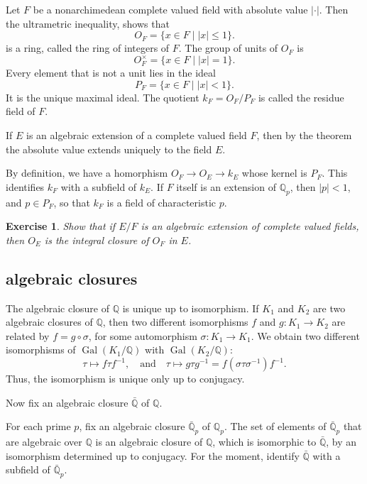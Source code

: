 \documentclass{amsart}
\def\op#1{{\operatorname{#1}}}
\newcommand{\ring}[1]{\mathbb{#1}}
\newtheorem{exercise}{Exercise}
\def\abs#1{{|#1|}}
\begin{document}
Let $F$ be a nonarchimedean complete valued field with absolute value $\abs{\cdot}$.
Then the ultrametric inequality, shows that
\[
O_F = \{x\in F \mid \abs{x}\le 1\}.
\]
is a ring, called the ring of integers of $F$.  
The group of units of $O_F$ is
\[
O^\times_F = \{x \in F \mid \abs{x}=1\}.
\]
Every element that is not a unit lies in the ideal
\[
P_F = \{x \in F \mid \abs{x}<1\}.
\]
It is the unique maximal ideal.  The quotient
$k_F = O_F/P_F$ is called the residue field of $F$.

If $E$ is an algebraic extension of a complete valued field $F$, 
then by the theorem the absolute
value extends uniquely to the field $E$.

By definition, we have a homorphism
$O_F \to O_E \to k_E$
whose kernel is $P_F$.  This identifies $k_F$ with a subfield of $k_E$.
If  $F$ itself is an extension of $\ring{Q}_p$, then $\abs{p}<1$, and $p\in P_F$,
so that $k_F$ is a field of  characteristic $p$.

\begin{exercise} Show that if $E/F$ is an algebraic extension of
  complete valued fields, then $O_E$ is the integral closure of $O_F$
  in $E$.
\end{exercise}

\subsection{algebraic closures}

The algebraic closure of $\ring{Q}$ is unique up to isomorphism.
If $K_1$ and $K_2$ are two algebraic closures of $\ring{Q}$, then two different
isomorphisms $f$ and $g:K_1\to K_2$ are related by $f = g \circ \sigma$, for some 
automorphism $\sigma: K_1\to K_1$.  We obtain two different isomorphisms
of $\op{Gal}(K_1/\ring{Q})$ with $\op{Gal}(K_2/\ring{Q})$:
\[
\tau \mapsto f \tau f^{-1},\quad \text{and}\quad \tau\mapsto g\tau g^{-1} = f (\sigma\tau\sigma^{-1}) f^{-1}.
\]
Thus, the isomorphism is unique only up to conjugacy.  

Now fix an algebraic closure $\bar{\ring{Q}}$ of $\ring{Q}$.

For each prime $p$, fix an algebraic closure $\bar{\ring{Q}}_p$ of
$\ring{Q}_p$.  The set of elements of $\bar{\ring{Q}}_p$ that are
algebraic over $\ring{Q}$ is an algebraic closure of $\ring{Q}$, which
is isomorphic to $\bar{\ring{Q}}$, by an isomorphism determined up to
conjugacy.  For the moment, identify $\bar{\ring{Q}}$ with a subfield
of $\bar{\ring{Q}}_p$.
\end{document}
